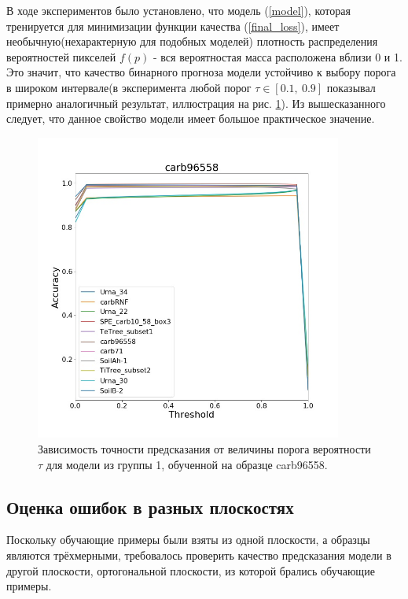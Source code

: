 \documentclass[12pt, a4paper]{extarticle}
\begin{document}
В ходе экспериментов было установлено, что 
модель (\ref{model}), которая тренируется для минимизации функции качества (\ref{final_loss}), имеет необычную(нехарактерную для подобных моделей) плотность распределения вероятностей пикселей $f(p)$ - вся вероятностая масса расположена вблизи 0 и 1. Это значит, что качество бинарного прогноза модели устойчиво к выбору порога в широком интервале(в эксперимента любой порог $\tau \in [0.1,\ 0.9]$ показывал примерно аналогичный результат, иллюстрация на рис. \ref{threshold_p}). Из вышесказанного следует, что данное свойство модели имеет большое практическое значение. 

\begin{figure}[h!]
\includegraphics[width=0.9\textwidth]{data/images/accuracy.jpg}
\caption{Зависимость точности предсказания от величины порога вероятности $\tau$ для модели из группы 1, обученной на образце carb96558.}
\label{threshold_p}
\end{figure}

\subsection{Оценка ошибок в разных плоскостях} \label{planes}

Поскольку обучающие примеры были взяты из одной плоскости, а образцы являются трёхмерными, требовалось проверить качество предсказания модели в другой плоскости, ортогональной плоскости, из которой брались обучающие примеры. 
\end{document}
